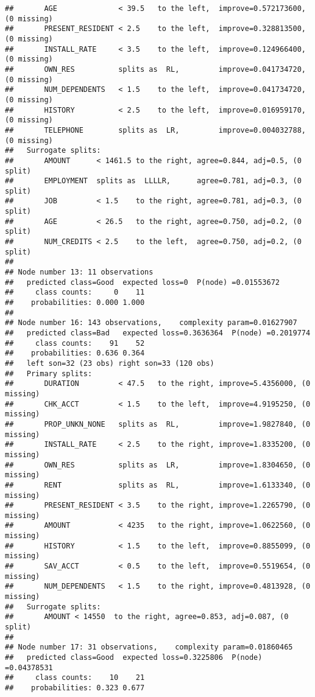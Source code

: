 \documentclass[
]{article}
\begin{document}
\begin{verbatim}
##       AGE              < 39.5   to the left,  improve=0.572173600, (0 missing)
##       PRESENT_RESIDENT < 2.5    to the left,  improve=0.328813500, (0 missing)
##       INSTALL_RATE     < 3.5    to the left,  improve=0.124966400, (0 missing)
##       OWN_RES          splits as  RL,         improve=0.041734720, (0 missing)
##       NUM_DEPENDENTS   < 1.5    to the left,  improve=0.041734720, (0 missing)
##       HISTORY          < 2.5    to the left,  improve=0.016959170, (0 missing)
##       TELEPHONE        splits as  LR,         improve=0.004032788, (0 missing)
##   Surrogate splits:
##       AMOUNT      < 1461.5 to the right, agree=0.844, adj=0.5, (0 split)
##       EMPLOYMENT  splits as  LLLLR,      agree=0.781, adj=0.3, (0 split)
##       JOB         < 1.5    to the right, agree=0.781, adj=0.3, (0 split)
##       AGE         < 26.5   to the right, agree=0.750, adj=0.2, (0 split)
##       NUM_CREDITS < 2.5    to the left,  agree=0.750, adj=0.2, (0 split)
## 
## Node number 13: 11 observations
##   predicted class=Good  expected loss=0  P(node) =0.01553672
##     class counts:     0    11
##    probabilities: 0.000 1.000 
## 
## Node number 16: 143 observations,    complexity param=0.01627907
##   predicted class=Bad   expected loss=0.3636364  P(node) =0.2019774
##     class counts:    91    52
##    probabilities: 0.636 0.364 
##   left son=32 (23 obs) right son=33 (120 obs)
##   Primary splits:
##       DURATION         < 47.5   to the right, improve=5.4356000, (0 missing)
##       CHK_ACCT         < 1.5    to the left,  improve=4.9195250, (0 missing)
##       PROP_UNKN_NONE   splits as  RL,         improve=1.9827840, (0 missing)
##       INSTALL_RATE     < 2.5    to the right, improve=1.8335200, (0 missing)
##       OWN_RES          splits as  LR,         improve=1.8304650, (0 missing)
##       RENT             splits as  RL,         improve=1.6133340, (0 missing)
##       PRESENT_RESIDENT < 3.5    to the right, improve=1.2265790, (0 missing)
##       AMOUNT           < 4235   to the right, improve=1.0622560, (0 missing)
##       HISTORY          < 1.5    to the left,  improve=0.8855099, (0 missing)
##       SAV_ACCT         < 0.5    to the left,  improve=0.5519654, (0 missing)
##       NUM_DEPENDENTS   < 1.5    to the right, improve=0.4813928, (0 missing)
##   Surrogate splits:
##       AMOUNT < 14550  to the right, agree=0.853, adj=0.087, (0 split)
## 
## Node number 17: 31 observations,    complexity param=0.01860465
##   predicted class=Good  expected loss=0.3225806  P(node) =0.04378531
##     class counts:    10    21
##    probabilities: 0.323 0.677 

\end{verbatim}
\end{document}
